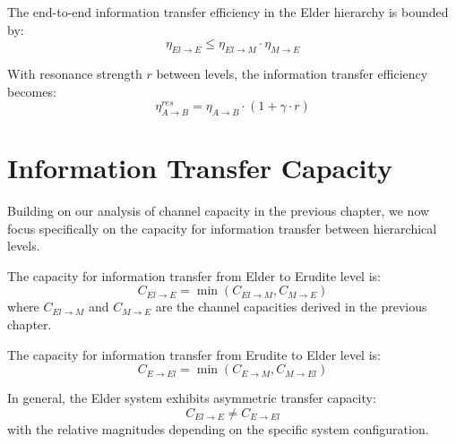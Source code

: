 \begin{theorem}
The end-to-end information transfer efficiency in the Elder hierarchy is bounded by:
\begin{equation}
\eta_{El \to E} \leq \eta_{El \to M} \cdot \eta_{M \to E}
\end{equation}
\end{theorem}

\begin{theorem}
With resonance strength $r$ between levels, the information transfer efficiency becomes:
\begin{equation}
\eta_{A \to B}^{res} = \eta_{A \to B} \cdot (1 + \gamma \cdot r)
\end{equation}
\end{theorem}

\section{Information Transfer Capacity}

Building on our analysis of channel capacity in the previous chapter, we now focus specifically on the capacity for information transfer between hierarchical levels.

\begin{theorem}
The capacity for information transfer from Elder to Erudite level is:
\begin{equation}
C_{El \to E} = \min\left(C_{El \to M}, C_{M \to E}\right)
\end{equation}
where $C_{El \to M}$ and $C_{M \to E}$ are the channel capacities derived in the previous chapter.
\end{theorem}

\begin{theorem}
The capacity for information transfer from Erudite to Elder level is:
\begin{equation}
C_{E \to El} = \min\left(C_{E \to M}, C_{M \to El}\right)
\end{equation}
\end{theorem}

\begin{theorem}
In general, the Elder system exhibits asymmetric transfer capacity:
\begin{equation}
C_{El \to E} \neq C_{E \to El}
\end{equation}
with the relative magnitudes depending on the specific system configuration.
\end{theorem}

